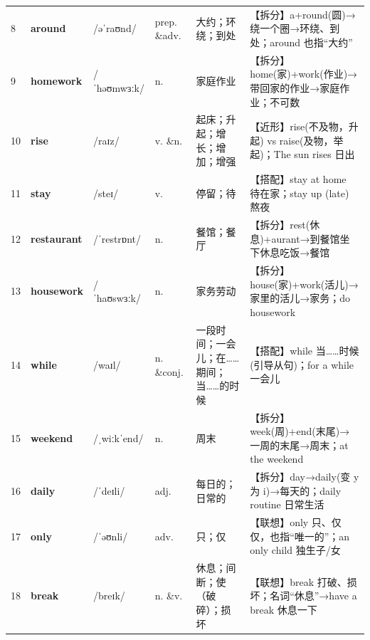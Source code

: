\documentclass[UTF8,a4paper,11pt,oneside]{ctexbook}
\newcommand{\cellword}[1]{{\bfseries\textcolor{wordcol}{#1}}}
\newcommand{\cellipa}[1]{{\footnotesize\textcolor{ipacol}{#1}}}
\newcommand{\cellpos}[1]{\textcolor{poscol}{#1}}
\newcommand{\cellno}[1]{\textcolor{volcolor!75!black}{#1}}
\begin{document}
{\begin{longtable}{@{}C{0.045\textwidth}L{0.155\textwidth}L{0.175\textwidth}C{0.070\textwidth}L{0.180\textwidth}L{0.282\textwidth}@{}}
\cellno{8} & \cellword{around} & \cellipa{/əˈraʊnd/} & \cellpos{prep. \&adv.} & 大约；环绕；到处 & \textcolor{tagSplit}{【拆分】}a+round(圆)→\allowbreak{}绕一个圈→\allowbreak{}环绕、到处；around 也指“大约” \\
 \cellno{9} & \cellword{homework} & \cellipa{/ˈhəʊmwɜːk/} & \cellpos{n.} & 家庭作业 & \textcolor{tagSplit}{【拆分】}home(家)+work(作业)→\allowbreak{}带回家的作业→\allowbreak{}家庭作业；不可数 \\
\cellno{10} & \cellword{rise} & \cellipa{/raɪz/} & \cellpos{v. \&n.} & 起床；升起；增长；增加；增强 & \textcolor{tagNear}{【近形】}rise(不及物，升起) vs raise(及物，举起)；The sun rises 日出 \\
 \cellno{11} & \cellword{stay} & \cellipa{/steɪ/} & \cellpos{v.} & 停留；待 & \textcolor{tagColloc}{【搭配】}stay at home 待在家；stay up (late) 熬夜 \\
\cellno{12} & \cellword{restaurant} & \cellipa{/ˈrestrɒnt/} & \cellpos{n.} & 餐馆；餐厅 & \textcolor{tagSplit}{【拆分】}rest(休息)+aurant→\allowbreak{}到餐馆坐下休息吃饭→\allowbreak{}餐馆 \\
 \cellno{13} & \cellword{housework} & \cellipa{/ˈhaʊswɜːk/} & \cellpos{n.} & 家务劳动 & \textcolor{tagSplit}{【拆分】}house(家)+work(活儿)→\allowbreak{}家里的活儿→\allowbreak{}家务；do housework \\
\cellno{14} & \cellword{while} & \cellipa{/waɪl/} & \cellpos{n. \&conj.} & 一段时间；一会儿；在……期间；当……的时候 & \textcolor{tagColloc}{【搭配】}while 当……时候(引导从句)；for a while 一会儿 \\
 \cellno{15} & \cellword{weekend} & \cellipa{/ˌwiːkˈend/} & \cellpos{n.} & 周末 & \textcolor{tagSplit}{【拆分】}week(周)+end(末尾)→\allowbreak{}一周的末尾→\allowbreak{}周末；at the weekend \\
\cellno{16} & \cellword{daily} & \cellipa{/ˈdeɪli/} & \cellpos{adj.} & 每日的；日常的 & \textcolor{tagSplit}{【拆分】}day→\allowbreak{}daily(变 y 为 i)→\allowbreak{}每天的；daily routine 日常生活 \\
 \cellno{17} & \cellword{only} & \cellipa{/ˈəʊnli/} & \cellpos{adv.} & 只；仅 & \textcolor{tagAssoc}{【联想】}only 只、仅仅，也指“唯一的”；an only child 独生子/女 \\
\cellno{18} & \cellword{break} & \cellipa{/breɪk/} & \cellpos{n. \&v.} & 休息；间断；使（破碎）；损坏 & \textcolor{tagAssoc}{【联想】}break 打破、损坏；名词“休息”→\allowbreak{}have a break 休息一下 \\

\end{longtable}}
\end{document}
